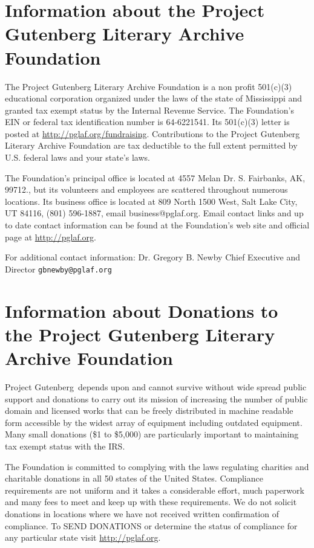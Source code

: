 \section[The Literary Archive Foundation]
{Information about the Project Gutenberg Literary Archive Foundation}
\label{license:sec:lit-archive-found}

The Project Gutenberg Literary Archive Foundation is a non profit
501(c)(3) educational corporation organized under the laws of the
state of Mississippi and granted tax exempt status by the Internal
Revenue Service.  The Foundation's EIN or federal tax identification
number is 64-6221541.  Its 501(c)(3) letter is posted at
\url{http://pglaf.org/fundraising}.  Contributions to the Project
Gutenberg Literary Archive Foundation are tax deductible to the full
extent permitted by U.S. federal laws and your state's laws.

The Foundation's principal office is located at 4557 Melan Dr. S.
Fairbanks, AK, 99712., but its volunteers and employees are scattered
throughout numerous locations.  Its business office is located at
809 North 1500 West, Salt Lake City, UT 84116, (801) 596-1887, email
business@pglaf.org.  Email contact links and up to date contact
information can be found at the Foundation's web site and official
page at \url{http://pglaf.org}.

For additional contact information:
     Dr. Gregory B. Newby
     Chief Executive and Director
     \texttt{gbnewby@pglaf.org}


\section[Donations]
{Information about Donations to the Project Gutenberg Literary Archive Foundation}
\label{license:sec:lit-archive-found-donations}

Project Gutenberg\texttrademark\ depends upon and
cannot survive without wide spread public support and donations to
carry out its mission of increasing the number of public domain and
licensed works that can be freely distributed in machine readable form
accessible by the widest array of equipment including outdated
equipment.  Many small donations (\$1 to \$5,000) are particularly
important to maintaining tax exempt status with the IRS.

The Foundation is committed to complying with the laws regulating
charities and charitable donations in all 50 states of the United
States.  Compliance requirements are not uniform and it takes a
considerable effort, much paperwork and many fees to meet and keep up
with these requirements.  We do not solicit donations in locations
where we have not received written confirmation of compliance.  To
SEND DONATIONS or determine the status of compliance for any
particular state visit \url{http://pglaf.org}.

